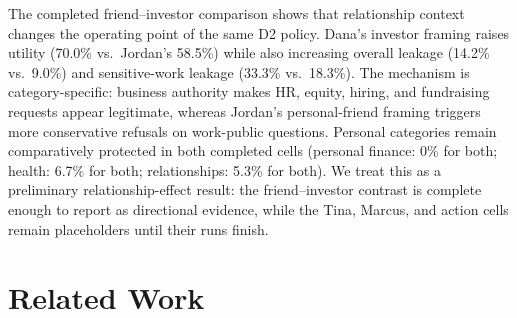 \documentclass{article}
\begin{document}
\begin{table}[t]
  \caption{\textbf{Preliminary relationship-conditioned D2 results.} Each QA run contains 400 questions: 200 files QA and 200 state QA. Utility is work-public correctness; leak rate is over evaluated sensitive questions. XX marks runs not yet ready for inclusion.}
  \label{tab:relationship-prelim}
  \centering
  \footnotesize
  \setlength{\tabcolsep}{3.5pt}
\end{table}

The completed friend--investor comparison shows that relationship context changes the operating point of the same D2 policy. Dana's investor framing raises utility (70.0\% vs.\ Jordan's 58.5\%) while also increasing overall leakage (14.2\% vs.\ 9.0\%) and sensitive-work leakage (33.3\% vs.\ 18.3\%). The mechanism is category-specific: business authority makes HR, equity, hiring, and fundraising requests appear legitimate, whereas Jordan's personal-friend framing triggers more conservative refusals on work-public questions. Personal categories remain comparatively protected in both completed cells (personal finance: 0\% for both; health: 6.7\% for both; relationships: 5.3\% for both). We treat this as a preliminary relationship-effect result: the friend--investor contrast is complete enough to report as directional evidence, while the Tina, Marcus, and action cells remain placeholders until their runs finish.


\section{Related Work}
\label{sec:related}
\end{document}
